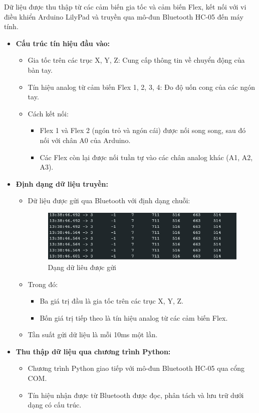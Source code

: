 Dữ liệu được thu thập từ các cảm biến gia tốc và cảm biến Flex, kết nối với vi điều khiển Arduino LilyPad và truyền qua mô-đun Bluetooth HC-05 đến máy tính.

\begin{itemize}
    \item \textbf{Cấu trúc tín hiệu đầu vào:}
    \begin{itemize}
        \item Gia tốc trên các trục X, Y, Z: Cung cấp thông tin về chuyển động của bàn tay.
        \item Tín hiệu analog từ cảm biến Flex 1, 2, 3, 4: Đo độ uốn cong của các ngón tay.
        \item Cách kết nối:
        \begin{itemize}
            \item Flex 1 và Flex 2 (ngón trỏ và ngón cái) được nối song song, sau đó nối với chân A0 của Arduino.
            \item Các Flex còn lại được nối tuần tự vào các chân analog khác (A1, A2, A3).
        \end{itemize}
    \end{itemize}

    \item \textbf{Định dạng dữ liệu truyền:}
    \begin{itemize}
        \item Dữ liệu được gửi qua Bluetooth với định dạng chuỗi:
        \begin{figure}[H]
            \centering
            \includegraphics[width=\textwidth,height=\textheight,keepaspectratio]{Images/SystemImpl/data.png}
            \caption{Dạng dữ liêu được gửi}
            \label{fig:enter-label}
        \end{figure}
        \item Trong đó:
        \begin{itemize}
            \item Ba giá trị đầu là gia tốc trên các trục X, Y, Z.
            \item Bốn giá trị tiếp theo là tín hiệu analog từ các cảm biến Flex.
        \end{itemize}
        \item Tần suất gửi dữ liệu là mỗi 10ms một lần.
    \end{itemize}

    \item \textbf{Thu thập dữ liệu qua chương trình Python:}
    \begin{itemize}
        \item Chương trình Python giao tiếp với mô-đun Bluetooth HC-05 qua cổng COM.
        \item Tín hiệu nhận được từ Bluetooth được đọc, phân tách và lưu trữ dưới dạng có cấu trúc.
    \end{itemize}
\end{itemize}

